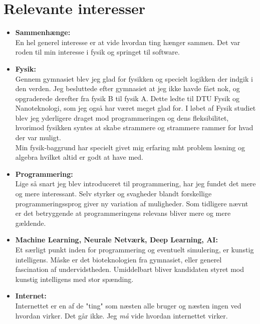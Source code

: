 \section{Relevante interesser}

\begin{itemize}
    \item \textbf{Sammenhænge:} \\
    En hel generel interesse er at vide hvordan ting hænger sammen. Det var roden til min interesse i fysik og springet til software.
    
    \item \textbf{Fysik:} \\
    Gennem gymnasiet blev jeg glad for fysikken og specielt logikken der indgik i den verden. Jeg besluttede efter gymnasiet at jeg ikke havde fået nok, og opgraderede derefter fra fysik B til fysik A. Dette ledte til DTU Fysik og Nanoteknologi, som jeg også har været meget glad for. I løbet af Fysik studiet blev jeg yderligere draget mod programmeringen og dens fleksibilitet, hvorimod fysikken syntes at skabe strammere og strammere rammer for hvad der var muligt. \\
    
    Min fysik-baggrund har specielt givet mig erfaring mht problem løsning og algebra hvilket altid er godt at have med.
    
    \item \textbf{Programmering:} \\
    Lige så snart jeg blev introduceret til programmering, har jeg fundet det mere og mere interessant. Selv styrker og svagheder blandt forskellige programmeringssprog giver ny variation af muligheder. Som tidligere nævnt er det betryggende at programmeringens relevans bliver mere og mere gældende.
    
    \item \textbf{Machine Learning, Neurale Netværk, Deep Learning, AI:} \\
    Et særligt punkt inden for programmering og eventuelt simulering, er kunstig intelligens. Måske er det bioteknologien fra gymnasiet, eller generel fascination af undervidstheden. Umiddelbart bliver kandidaten styret mod kunstig intelligens med stor spænding.
    
    \item \textbf{Internet:} \\
    Internettet er en af de "ting" som næsten alle bruger og næsten ingen ved hvordan virker. Det går ikke. Jeg \textit{må} vide hvordan internettet virker.
    
\end{itemize}